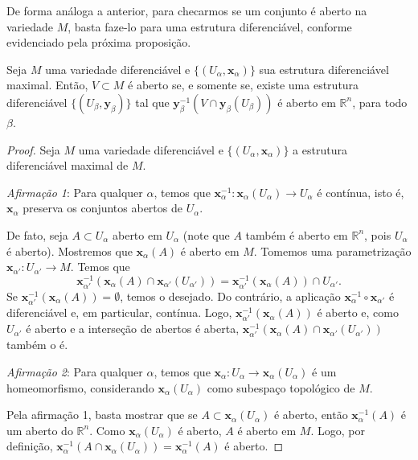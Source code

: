	De forma análoga a anterior, para checarmos se um conjunto é aberto na variedade $M$, basta faze-lo para uma estrutura diferenciável, conforme evidenciado pela próxima proposição.
	\begin{proposition}
		\label{prop:aberto-estrutura-diferencial}
		Seja $M$ uma variedade diferenciável e $\{ (U_{\alpha},\mathbf{x}_{\alpha}) \}$ sua estrutura diferenciável maximal. Então, $V \subset M$ é aberto se, e somente se, existe uma estrutura diferenciável $\{ (U_{\beta}, \mathbf{y}_{\beta}) \}$ tal que $\mathbf{y}_{\beta}^{-1}(V \cap \mathbf{y}_{\beta}(U_{\beta}))$ é aberto em $\mathbb{R}^{n}$, para todo $\beta$.
		\begin{proof}

			Seja $M$ uma variedade diferenciável e $\{ (U_{\alpha}, \mathbf{x}_{\alpha}) \}$ a estrutura diferenciável maximal de $M$.

			\emph{Afirmação 1}:  Para qualquer $\alpha$, temos que $\mathbf{x}_{\alpha}^{-1}:\mathbf{x}_{\alpha}(U_{\alpha})\to U_{\alpha}$ é contínua, isto é, $\mathbf{x}_{\alpha}$ preserva os conjuntos abertos de $U_{\alpha}$.

			De fato, seja $A \subset U_{\alpha}$ aberto em $U_{\alpha}$ (note que $A$ também é aberto em $\mathbb{R}^{n}$, pois $U_{\alpha}$ é aberto). Mostremos que $\mathbf{x}_{\alpha}(A)$ é aberto em $M$. Tomemos uma parametrização $\mathbf{x}_{\alpha'}:U_{\alpha'}\to M$. Temos que
			\begin{equation*}
				\mathbf{x}_{\alpha'}^{-1}(\mathbf{x}_{\alpha}(A)\cap \mathbf{x}_{\alpha'}(U_{\alpha'}))=\mathbf{x}_{\alpha'}^{-1}(\mathbf{x}_{\alpha}(A)) \cap U_{\alpha'}.
			\end{equation*}
			Se $\mathbf{x}_{\alpha'}^{-1}(\mathbf{x}_{\alpha}(A))=\emptyset$, temos o desejado. Do contrário, a aplicação $\mathbf{x}_{\alpha}^{-1} \circ \mathbf{x}_{\alpha'}$ é diferenciável e, em particular, contínua. Logo, $\mathbf{x}_{\alpha'}^{-1}(\mathbf{x}_{\alpha}(A))$ é aberto e, como $U_{\alpha'}$ é aberto e a interseção de abertos é aberta, $\mathbf{x}_{\alpha'}^{-1}(\mathbf{x}_{\alpha}(A)\cap \mathbf{x}_{\alpha'}(U_{\alpha'}))$ também o é.

			\emph{Afirmação 2}: Para qualquer $\alpha$, temos que $\mathbf{x}_{\alpha}:U_{\alpha}\to \mathbf{x}_{\alpha}(U_{\alpha})$ é um homeomorfismo, considerando $\mathbf{x}_{\alpha}(U_{\alpha})$ como subespaço topológico de $M$.

			Pela afirmação 1, basta mostrar que se $A \subset \mathbf{x}_{\alpha}(U_{\alpha})$ é aberto, então $\mathbf{x}_{\alpha}^{-1}(A)$ é um aberto do $\mathbb{R}^{n}$. Como $\mathbf{x}_{\alpha}(U_{\alpha})$ é aberto, $A$ é aberto em $M$. Logo, por definição, $\mathbf{x}_{\alpha}^{-1}(A \cap \mathbf{x}_{\alpha}(U_{\alpha}))=\mathbf{x}_{\alpha}^{-1}(A)$ é aberto.


\end{proof}
\end{proposition}
